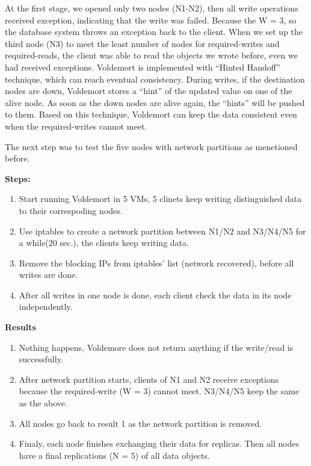 \documentclass[a4paper]{article}
\begin{document}
At the first stage, we opened only two nodes (N1-N2), then all write operations received exception, indicating that the write was failed. Because the W = 3, so the database system throws an exception back to the client. When we set up the third node (N3) to meet the least number of nodes for required-writes and required-reads, the client was able to read the objects we wrote before, even we had received exceptions. Voldemort is implemented with ``Hinted Handoff'' technique, which can reach eventual consistency. During writes, if the destination nodes are down, Voldemort stores a ``hint'' of the updated value on one of the alive node. As soon as the down nodes are alive again, the ``hints'' will be pushed to them. Based on this technique, Voldemort can keep the data consistent even when the required-writes cannot meet.

The next step was to test the five nodes with network partitions as menetioned before. 

{\bf Steps:}

\begin{enumerate}
  \item Start running Voldemort in 5 VMs, 5 clinets keep writing distinguished data to their correspoding nodes.
  \item Use iptables to create a network partition between N1/N2 and N3/N4/N5 for a while(20 sec.), the clients keep writing data.
  \item Remove the blocking IPs from iptables' list (network recovered), before all writes are done.
  \item After all writes in one node is done, each client check the data in its node independently.
\end{enumerate}

{\bf Results}

\begin{enumerate}
  \item Nothing happens, Voldemore does not return anything if the write/read is successfully.
  \item After network partition starts, clients of N1 and N2 receive exceptions because the required-write (W = 3) cannot meet. N3/N4/N5 keep the same as the above. 
  \item All nodes go back to result 1 as the network partition is removed.
  \item Finaly, each node finishes exchanging their data for replicas. Then all nodes have a final replications (N = 5) of all data objects.
\end{enumerate}
\end{document}

